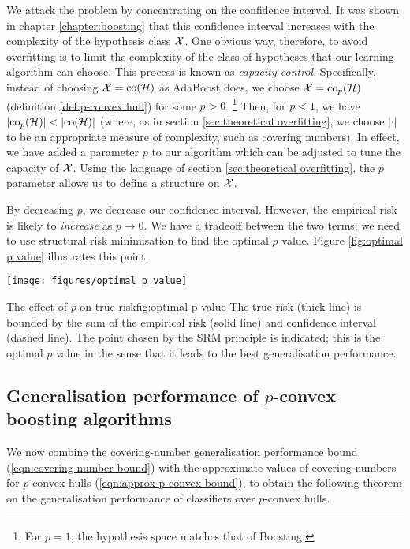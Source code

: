 We attack the problem by concentrating on the confidence interval.
It was shown in chapter \ref{chapter:boosting} that this confidence
interval increases with the complexity of the hypothesis class
$\mathcal{X}$.  One obvious way, therefore, to avoid overfitting is to limit
the complexity of the class of hypotheses that our learning algorithm
can choose.  This process is known as \emph{capacity control}.
Specifically, instead of choosing $\mathcal{X} = \mathrm{co} (\mathcal{H})$ as AdaBoost
does, we choose $\mathcal{X} = \mathrm{co}_p(\mathcal{H})$ (definition \ref{def:p-convex
hull}) for some $p > 0$.%
\footnote{For $p=1$, the hypothesis space matches that of Boosting.}
Then, for $p < 1$, we have $|\mathrm{co}_p (\mathcal{H})| < |\mathrm{co} (\mathcal{H})|$ (where,
as in section \ref{sec:theoretical overfitting}, we choose $|\cdot|$ to
be an appropriate measure of complexity, such as covering numbers).
In effect, we have added a parameter $p$ to our algorithm which can be
adjusted to tune the capacity of $\mathcal{X}$.  Using the language of
section \ref{sec:theoretical overfitting}, the $p$ parameter allows us
to define a structure on $\mathcal{X}$.

By decreasing $p$, we decrease our confidence interval.  However, the
empirical risk is likely to \emph{increase} as $p \rightarrow 0$.
We have a tradeoff between the two terms; we need to use structural
risk minimisation to find the optimal $p$ value.  Figure
\ref{fig:optimal p value} illustrates this point.

\begin{linefigure}
\begin{center}
\texttt{[image: figures/optimal\_p\_value]}
\end{center}
\begin{capt}{The effect of $p$ on true risk}{fig:optimal p value}
The true risk (thick line) is bounded by the sum of the empirical risk
(solid line) and confidence interval (dashed line).  The point chosen
by the SRM principle is indicated; this is the optimal $p$ value in
the sense that it leads to the best generalisation performance.
\end{capt}
\end{linefigure}

\subsection{Generalisation performance of $p$-convex boosting
algorithms}

We now combine the covering-number generalisation performance bound
(\ref{eqn:covering number bound}) with the approximate values of
covering numbers for $p$-convex hulls (\ref{eqn:approx p-convex
bound}), to obtain the following theorem on the generalisation
performance of classifiers over $p$-convex hulls.


